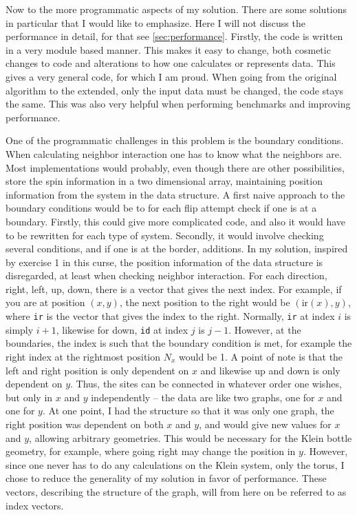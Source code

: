\documentclass[12pt, a4paper]{article}
\begin{document}
Now to the more programmatic aspects of my solution.
There are some solutions in particular that I would like to emphasize.
Here I will not discuss the performance in detail, for that see \ref{sec:performance}.
Firstly, the code is written in a very module based manner.
This makes it easy to change, both cosmetic changes to code and alterations to how one calculates or represents data.
This gives a very general code, for which I am proud.
When going from the original algorithm to the extended, only the input data must be changed, the code stays the same.
This was also very helpful when performing benchmarks and improving performance.

One of the programmatic challenges in this problem is the boundary conditions.
When calculating neighbor interaction one has to know what the neighbors are.
Most implementations would probably, even though there are other possibilities, store the spin information in a two dimensional array, maintaining position information from the system in the data structure.
A first naive approach to the boundary conditions would be to for each flip attempt check if one is at a boundary.
Firstly, this could give more complicated code, and also it would have to be rewritten for each type of system.
Secondly, it would involve checking several conditions, and if one is at the border, additions.
In my solution, inspired by exercise 1 in this curse, the position information of the data structure is disregarded, at least when checking neighbor interaction.
For each direction, right, left, up, down, there is a vector that gives the next index.
For example, if you are at position $(x, y)$, the next position to the right would be $(\text{ir}(x), y)$, where \verb|ir| is the vector that gives the index to the right.
Normally, \verb|ir| at index $i$ is simply $i+1$, likewise for down, \verb|id| at index $j$ is $j-1$.
However, at the boundaries, the index is such that the boundary condition is met, for example the right index at the rightmost position $N_x$ would be 1.
A point of note is that the left and right position is only dependent on $x$ and likewise up and down is only dependent on $y$.
Thus, the sites can be connected in whatever order one wishes, but only in $x$ and $y$ independently -- the data are like two graphs, one for $x$ and one for $y$.
At one point, I had the structure so that it was only one graph, the right position was dependent on both $x$ and $y$, and would give new values for $x$ and $y$, allowing arbitrary geometries.
This would be necessary for the Klein bottle geometry, for example, where going right may change the position in $y$.
However, since one never has to do any calculations on the Klein system, only the torus, I chose to reduce the generality of my solution in favor of performance.
These vectors, describing the structure of the graph, will from here on be referred to as index vectors.
\end{document}
